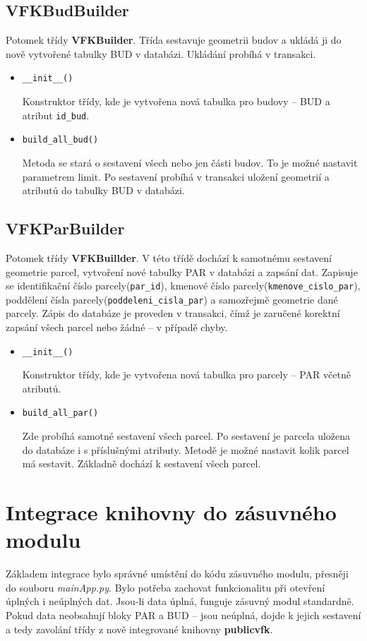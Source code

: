 \subsection{VFKBudBuilder}
Potomek třídy \textbf{VFKBuilder}. Třída sestavuje geometrii budov a ukládá ji do nově vytvořené tabulky BUD v databázi. Ukládání probíhá v transakci.
\begin{itemize}[leftmargin=50pt]
\item \verb|__init__()|

Konstruktor třídy, kde je vytvořena nová tabulka pro budovy -- BUD a atribut \verb|id_bud|.
\item \verb|build_all_bud()|

Metoda se stará o sestavení všech nebo jen části budov. To je možné nastavit parametrem limit. Po sestavení probíhá v transakci uložení geometrií a atributů do tabulky BUD v databázi.
\end{itemize}
\subsection{VFKParBuilder}
Potomek třídy \textbf{VFKBuillder}. V této třídě dochází k samotnému sestavení geometrie parcel, vytvoření nové tabulky PAR v databázi a zapsání dat. Zapisuje se identifikační číslo parcely(\verb|par_id|), kmenové číslo parcely(\verb|kmenove_cislo_par|), poddělení čísla parcely(\verb|poddeleni_cisla_par|) a samozřejmě geometrie dané parcely. Zápis do databáze je proveden v transakci, čímž je zaručené korektní zapsání všech parcel nebo žádné -- v případě chyby.

\begin{itemize}[leftmargin=50pt]
\item \verb|__init__()|

Konstruktor třídy, kde je vytvořena nová tabulka pro parcely -- PAR včetně atributů.
\item \verb|build_all_par()|

Zde probíhá samotné sestavení všech parcel. Po sestavení je parcela uložena do databáze i s příslušnými atributy. Metodě je možné nastavit kolik parcel má sestavit. Základně dochází k sestavení všech parcel.

\end{itemize}
\section{Integrace knihovny do zásuvného modulu}
\label{sec:integrace_knihovny}
Základem integrace bylo správné umístění do kódu zásuvného modulu, přesněji do souboru \textit{mainApp.py}. Bylo potřeba zachovat funkcionalitu při otevření úplných i neúplných dat. Jsou-li data úplná, funguje zásuvný modul standardně. Pokud data neobsahují bloky PAR a BUD -- jsou neúplná, dojde k jejich sestavení a tedy zavolání třídy z nově integrované knihovny \textbf{publicvfk}.

